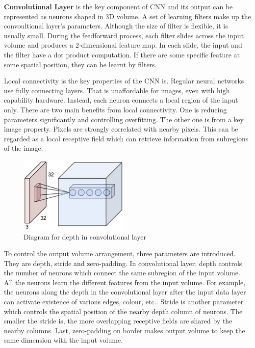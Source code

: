 \textbf{Convolutional Layer} is the key component of CNN and its output can be represented as neurons shaped in 3D volume. A set of learning filters make up the convoultional layer's parameters. Although the size of filter is flexible, it is usually small. During the feedforward process, each filter slides across the input volume and produces a $2$-dimensional feature map. In each slide, the input and the filter have a dot product computation. If there are some specific feature at some spatial position, they can be learnt by filters.

Local connectivity is the key properties of the CNN is. Regular neural networks use fully connecting layers. That is unaffordable for images, even with high capability hardware. Instead, each neuron connects a local region of the input only. There are two main benefits from local connectivity. One is reducing parameters significantly and controlling overfitting. The other one is from a key image property. Pixels are strongly correlated with nearby pixels. This can be regarded as a local receptive field which can retrieve information from subregions of the image.

\graphicspath{ {./Figures/} }
\begin{figure}
  \begin{center}
    \includegraphics[width=0.48\textwidth]{depthcol.jpeg}
  \end{center}
  \caption{Diagram for depth in convolutional layer}
\end{figure}
To control the output volume arrangement, three parameters are introduced. They are depth, stride and zero-padding. In convolutional layer, depth controls the number of neurons which connect the same subregion of the input volume. All the neurons learn the different features from the input volume. For example, the neurons along the depth in the convolutional layer after the input data layer can activate existence of various edges, colour, etc.. Stride is another parameter which controls the spatial position of the nearby depth column of neurons. The smaller the stride is, the more overlapping receptive fields are shared by the nearby columns. Last, zero-padding on border makes output volume to keep the same dimension with the input volume.

